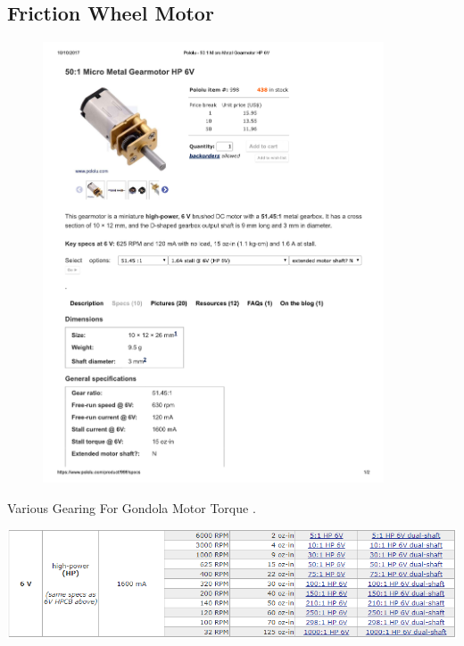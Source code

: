 \documentclass[../main.tex]{subfiles}
\begin{document}
\subsection{Friction Wheel Motor \cite{FrictionMotor}} \label{FrictionMotor}
\begin{figure}[H]
	\centering
	\includegraphics[width=0.9\textwidth]{img/specs/Friction-Wheel-Motor-Specs.pdf}
\end{figure}

\begin{table}[H]
	\centering
	\caption{Various Gearing For Gondola Motor Torque \cite{FrictionMotor}.}
	\includegraphics[width=\textwidth]{img/specs/motorTorques.PNG}
\end{table}

\end{document}
